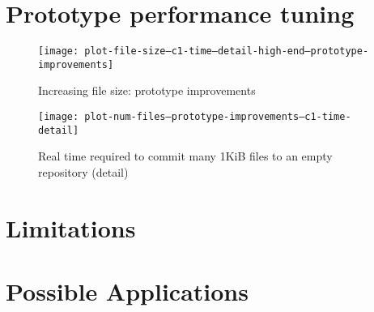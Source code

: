 


\section{Prototype performance tuning}

\begin{figure}[]
  \caption{Increasing file size: prototype improvements}
  \label{fig:plot-file-size--c1-time--prototype-improvements}
  \centering
    \texttt{[image: plot-file-size--c1-time--detail-high-end--prototype-improvements]}
\end{figure}

\begin{figure}[p]
  \caption{Real time required to commit many 1KiB files to an empty repository
  (detail)}
  \label{fig:plot-num-files--prototype-improvements--c1-time-detail}
  \centering
    \texttt{[image: plot-num-files--prototype-improvements--c1-time-detail]}
\end{figure}

%


\section{Limitations}



%


\section{Possible Applications}

